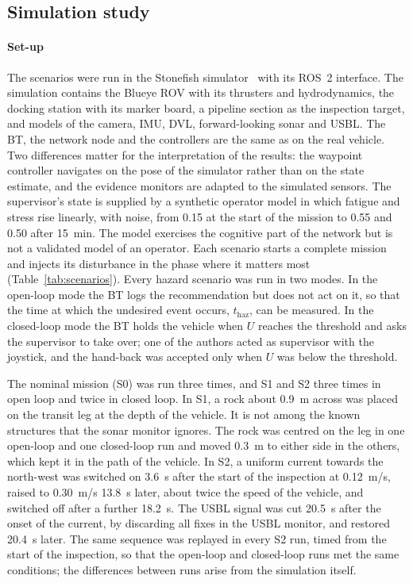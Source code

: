 \subsection{Simulation study}
\label{sec:res-sim}

\paragraph{Set-up}
The scenarios were run in the Stonefish simulator~\citep{Cieslak2019Stonefish} with its ROS~2 interface. The simulation contains the Blueye ROV with its thrusters and hydrodynamics, the docking station with its marker board, a pipeline section as the inspection target, and models of the camera, IMU, DVL, forward-looking sonar and USBL. The BT, the network node and the controllers are the same as on the real vehicle. Two differences matter for the interpretation of the results: the waypoint controller navigates on the pose of the simulator rather than on the state estimate, and the evidence monitors are adapted to the simulated sensors. The supervisor's state is supplied by a synthetic operator model in which fatigue and stress rise linearly, with noise, from 0.15 at the start of the mission to 0.55 and 0.50 after 15~min. The model exercises the cognitive part of the network but is not a validated model of an operator. Each scenario starts a complete mission and injects its disturbance in the phase where it matters most (Table~\ref{tab:scenarios}). Every hazard scenario was run in two modes. In the open-loop mode the BT logs the recommendation but does not act on it, so that the time at which the undesired event occurs, $t_{\mathrm{haz}}$, can be measured. In the closed-loop mode the BT holds the vehicle when $U$ reaches the threshold and asks the supervisor to take over; one of the authors acted as supervisor with the joystick, and the hand-back was accepted only when $U$ was below the threshold.

The nominal mission (S0) was run three times, and S1 and S2 three times in open loop and twice in closed loop. In S1, a rock about 0.9~m across was placed on the transit leg at the depth of the vehicle. It is not among the known structures that the sonar monitor ignores. The rock was centred on the leg in one open-loop and one closed-loop run and moved 0.3~m to either side in the others, which kept it in the path of the vehicle. In S2, a uniform current towards the north-west was switched on 3.6~s after the start of the inspection at 0.12~m/s, raised to 0.30~m/s 13.8~s later, about twice the speed of the vehicle, and switched off after a further 18.2~s. The USBL signal was cut 20.5~s after the onset of the current, by discarding all fixes in the USBL monitor, and restored 20.4~s later. The same sequence was replayed in every S2 run, timed from the start of the inspection, so that the open-loop and closed-loop runs met the same conditions; the differences between runs arise from the simulation itself.

